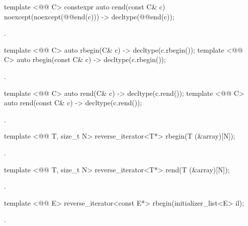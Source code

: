 %
\begin{itemdecl}
template <@@ C> constexpr auto cend(const C& c) noexcept(noexcept(@@end(c)))
  -> decltype(@@end(c));
\end{itemdecl}
\begin{itemdescr}
\pnum \returns {}.
\end{itemdescr}

%
\begin{itemdecl}
template <@@ C> auto rbegin(C& c) -> decltype(c.rbegin());
template <@@ C> auto rbegin(const C& c) -> decltype(c.rbegin());
\end{itemdecl}
\begin{itemdescr}
\pnum \returns {}.
\end{itemdescr}

%
\begin{itemdecl}
template <@@ C> auto rend(C& c) -> decltype(c.rend());
template <@@ C> auto rend(const C& c) -> decltype(c.rend());
\end{itemdecl}
\begin{itemdescr}
\pnum \returns {}.
\end{itemdescr}

%
\begin{itemdecl}
template <@@ T, size_t N> reverse_iterator<T*> rbegin(T (&array)[N]);
\end{itemdecl}
\begin{itemdescr}
\pnum \returns {}.
\end{itemdescr}

%
\begin{itemdecl}
template <@@ T, size_t N> reverse_iterator<T*> rend(T (&array)[N]);
\end{itemdecl}
\begin{itemdescr}
\pnum \returns {}.
\end{itemdescr}

%
\begin{itemdecl}
template <@@ E> reverse_iterator<const E*> rbegin(initializer_list<E> il);
\end{itemdecl}
\begin{itemdescr}
\pnum \returns {}.
\end{itemdescr}


